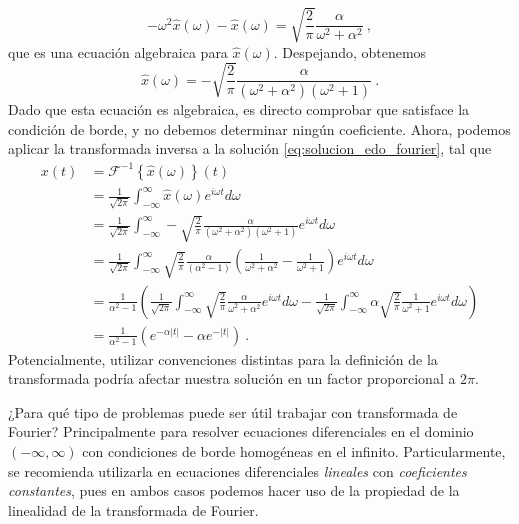 \begin{ejemplo}
\begin{equation}
        -\omega^2 \hat{x}(\omega) - \hat{x}(\omega) = \sqrt{\frac{2}{\pi}} \frac{\alpha}{\omega^2 + \alpha^2} \ ,
    \end{equation}
    que es una ecuación algebraica para $\hat{x}(\omega)$. Despejando, obtenemos
    \begin{equation} \label{eq:solucion_edo_fourier}
        \hat{x}(\omega) = - \sqrt{\frac{2}{\pi}} \frac{\alpha}{(\omega^2 + \alpha^2) (\omega^2 + 1)} \ .
    \end{equation}
    Dado que esta ecuación es algebraica, es directo comprobar que satisface la condición de borde, y no debemos determinar ningún coeficiente. Ahora, podemos aplicar la transformada inversa a la solución \eqref{eq:solucion_edo_fourier}, tal que
    \begin{align}
        x(t) & = \mathcal{F}^{-1} \left\{ \hat{x}(\omega) \right\} (t) \nonumber \\
        & = \frac{1}{\sqrt{2\pi}} \int_{-\infty}^\infty \hat{x}(\omega) e^{i\omega t} d\omega \nonumber \\
        & = \frac{1}{\sqrt{2\pi}} \int_{-\infty}^\infty - \sqrt{\frac{2}{\pi}} \frac{\alpha}{(\omega^2 + \alpha^2) (\omega^2 + 1)} e^{i\omega t} d\omega \nonumber \\
        & = \frac{1}{\sqrt{2\pi}} \int_{-\infty}^\infty \sqrt{\frac{2}{\pi}} \frac{\alpha}{(\alpha^2 - 1)} \left( \frac{1}{\omega^2 + \alpha^2} - \frac{1}{\omega^2 + 1} \right) e^{i\omega t} d\omega \nonumber \\
        & = \frac{1}{\alpha^2 - 1} \left( \frac{1}{\sqrt{2\pi}} \int_{-\infty}^\infty \sqrt{\frac{2}{\pi}} \frac{\alpha}{\omega^2 + \alpha^2} e^{i\omega t} d\omega - \frac{1}{\sqrt{2\pi}} \int_{-\infty}^\infty \alpha \sqrt{\frac{2}{\pi}} \frac{1}{\omega^2 + 1} e^{i\omega t} d\omega \right) \nonumber \\
        & = \frac{1}{\alpha^2-1} \left( e^{-\alpha |t|} - \alpha e^{-|t|} \right)\ .
    \end{align}
    Potencialmente, utilizar convenciones distintas para la definición de la transformada podría afectar nuestra solución en un factor proporcional a $2\pi$.
\end{ejemplo}

¿Para qué tipo de problemas puede ser útil trabajar con transformada de Fourier? Principalmente para resolver ecuaciones diferenciales en el dominio $(-\infty, \infty)$ con condiciones de borde homogéneas en el infinito. Particularmente, se recomienda utilizarla en ecuaciones diferenciales \emph{lineales} con \emph{coeficientes constantes}, pues en ambos casos podemos hacer uso de la propiedad de la linealidad de la transformada de Fourier.

